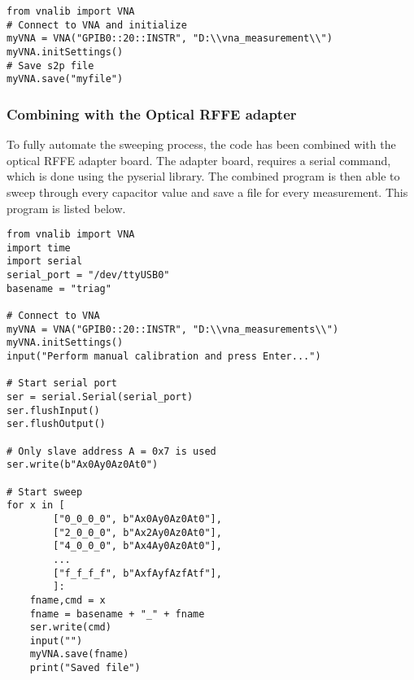 \begin{lstlisting}
from vnalib import VNA
# Connect to VNA and initialize
myVNA = VNA("GPIB0::20::INSTR", "D:\\vna_measurement\\")
myVNA.initSettings()
# Save s2p file
myVNA.save("myfile")
\end{lstlisting}
 
\subsubsection{Combining with the Optical RFFE adapter}
To fully automate the sweeping process, the code has been combined with the optical RFFE adapter board. The adapter board, requires a serial command, which is done using the pyserial library. The combined program is then able to sweep through every capacitor value and save a file for every measurement. This program is listed below. 

\begin{lstlisting}
from vnalib import VNA
import time
import serial
serial_port = "/dev/ttyUSB0"
basename = "triag"

# Connect to VNA
myVNA = VNA("GPIB0::20::INSTR", "D:\\vna_measurements\\")
myVNA.initSettings()
input("Perform manual calibration and press Enter...")

# Start serial port
ser = serial.Serial(serial_port)
ser.flushInput()
ser.flushOutput()

# Only slave address A = 0x7 is used
ser.write(b"Ax0Ay0Az0At0")

# Start sweep
for x in [
        ["0_0_0_0", b"Ax0Ay0Az0At0"],
        ["2_0_0_0", b"Ax2Ay0Az0At0"],
        ["4_0_0_0", b"Ax4Ay0Az0At0"],
        ...
        ["f_f_f_f", b"AxfAyfAzfAtf"],
        ]:
    fname,cmd = x
    fname = basename + "_" + fname
    ser.write(cmd)
    input("")
    myVNA.save(fname)
    print("Saved file")
\end{lstlisting}





